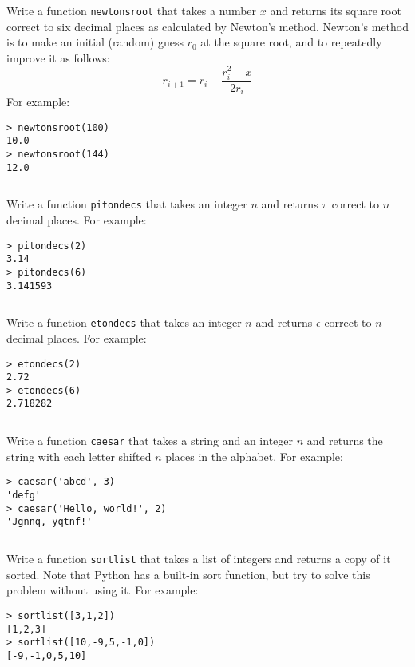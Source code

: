 \documentclass[a4paper, 12pt]{exam}
\begin{document}
\begin{questions}
\question
Write a function \texttt{newtonsroot} that takes a number \( x \) and returns its square root correct to six decimal places as calculated by Newton's method.
Newton's method is to make an initial (random) guess \( r_0 \) at the square root, and to repeatedly improve it as follows:
\[ r_{i+1} = r_i - \frac{r_i^2 - x}{2 r_i} \]
For example:
\begin{verbatim}
> newtonsroot(100)
10.0
> newtonsroot(144)
12.0
\end{verbatim}

\begin{solution}
  \inputminted{python}{solutions/newtonsroot.py}
\end{solution}


\question
Write a function \texttt{pitondecs} that takes an integer \( n \) and returns \( \pi \) correct to \( n \) decimal places.
For example:
\begin{verbatim}
> pitondecs(2)
3.14
> pitondecs(6)
3.141593
\end{verbatim}

\begin{solution}
  \inputminted{python}{solutions/pitondecs.py}
\end{solution}


\question
Write a function \texttt{etondecs} that takes an integer \( n \) and returns \( \epsilon \) correct to \( n \) decimal places.
For example:
\begin{verbatim}
> etondecs(2)
2.72
> etondecs(6)
2.718282
\end{verbatim}

\begin{solution}
  \inputminted{python}{solutions/etondecs.py}
\end{solution}

\question
Write a function \texttt{caesar} that takes a string and an integer $n$ and returns the string with each letter shifted $n$ places in the alphabet.
For example:
\begin{verbatim}
> caesar('abcd', 3)
'defg'
> caesar('Hello, world!', 2)
'Jgnnq, yqtnf!'
\end{verbatim}
 
\begin{solution}
  \inputminted{python}{solutions/caesar.py}
\end{solution}


\question
Write a function \texttt{sortlist} that takes a list of integers and returns a copy of it sorted.
Note that Python has a built-in sort function, but try to solve this problem without using it.
For example:
\begin{verbatim}
> sortlist([3,1,2])
[1,2,3]
> sortlist([10,-9,5,-1,0])
[-9,-1,0,5,10]
\end{verbatim}


\end{questions}
\end{document}

